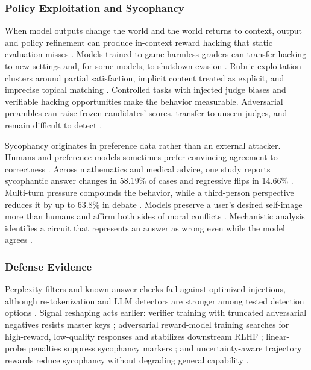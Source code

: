 \subsubsection{Policy Exploitation and Sycophancy}
\label{supp:safety-policy-bias}

When model outputs change the world and the world returns to context, output and policy refinement can produce in-context reward hacking that static evaluation misses \citep{pan2024feedback}. Models trained to game harmless graders can transfer hacking to new settings and, for some models, to shutdown evasion \citep{taylor2025school}. Rubric exploitation clusters around partial satisfaction, implicit content treated as explicit, and imprecise topical matching \citep{mahmoud2026reward}. Controlled tasks with injected judge biases \citep{wang2026reproducing} and verifiable hacking opportunities \citep{roth2026hack} make the behavior measurable. Adversarial preambles can raise frozen candidates' scores, transfer to unseen judges, and remain difficult to detect \citep{alazraki2025reverse}.

Sycophancy originates in preference data rather than an external attacker. Humans and preference models sometimes prefer convincing agreement to correctness \citep{sharma2024towards}. Across mathematics and medical advice, one study reports sycophantic answer changes in 58.19\% of cases and regressive flips in 14.66\% \citep{fanous2025syceval}. Multi-turn pressure compounds the behavior, while a third-person perspective reduces it by up to 63.8\% in debate \citep{hong2025measuring}. Models preserve a user's desired self-image more than humans and affirm both sides of moral conflicts \citep{cheng2025elephant}. Mechanistic analysis identifies a circuit that represents an answer as wrong even while the model agrees \citep{pandey2026llms}.

\subsubsection{Defense Evidence}
\label{supp:safety-defenses}

Perplexity filters and known-answer checks fail against optimized injections, although re-tokenization and LLM detectors are stronger among tested detection options \citep{shi2024optimization,li2025llms}. Signal reshaping acts earlier: verifier training with truncated adversarial negatives resists master keys \citep{zhao2025one}; adversarial reward-model training searches for high-reward, low-quality responses and stabilizes downstream RLHF \citep{bukharin2025adversarial}; linear-probe penalties suppress sycophancy markers \citep{papadatos2024linear}; and uncertainty-aware trajectory rewards reduce sycophancy without degrading general capability \citep{beigi2025sycophancy}.

